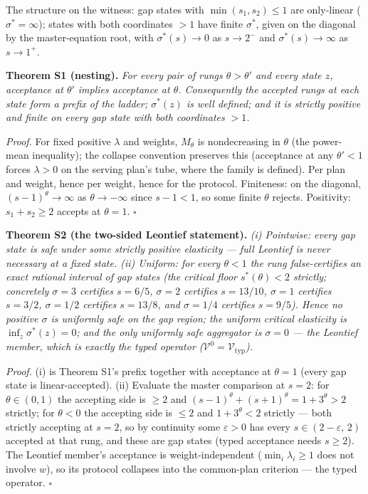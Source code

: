 \documentclass[3p,11pt]{elsarticle}
\begin{document}
The structure on the witness: gap states with \(\min(s_1, s_2) \le 1\)
are only-linear (\(\sigma^* = \infty\)); states with both coordinates
\(> 1\) have finite \(\sigma^*\), given on the diagonal by the
master-equation root, with \(\sigma^*(s) \to 0\) as \(s \to 2^-\)
and \(\sigma^*(s) \to \infty\) as \(s \to 1^+\).

\textbf{Theorem S1 (nesting).} \emph{For every pair of rungs
\(\theta > \theta'\) and every state \(z\), acceptance at
\(\theta'\) implies acceptance at \(\theta\). Consequently the
accepted rungs at each state form a prefix of the ladder;
\(\sigma^*(z)\) is well defined; and it is strictly positive and finite
on every gap state with both coordinates \(> 1\).}

\emph{Proof.} For fixed positive \(\lambda\) and weights,
\(M_\theta\) is nondecreasing in \(\theta\) (the power-mean
inequality); the collapse convention preserves this (acceptance at any
\(\theta' < 1\) forces \(\lambda > 0\) on the serving plan's tube,
where the family is defined). Per plan and weight, hence per weight, hence
for the protocol. Finiteness: on the diagonal, \((s-1)^\theta \to
\infty\) as \(\theta \to -\infty\) since \(s - 1 < 1\), so some
finite \(\theta\) rejects. Positivity: \(s_1 + s_2 \ge 2\) accepts
at \(\theta = 1\). \ensuremath{\square}

\textbf{Theorem S2 (the two-sided Leontief statement).} \emph{(i)
Pointwise: every gap state is safe under some strictly positive
elasticity --- full Leontief is never necessary at a fixed state. (ii)
Uniform: for every \(\theta < 1\) the rung false-certifies an exact
rational interval of gap states (the critical floor \(s^*(\theta) < 2\)
strictly; concretely \(\sigma = 3\) certifies \(s = 6/5\),
\(\sigma = 2\) certifies \(s = 13/10\), \(\sigma = 1\) certifies
\(s = 3/2\), \(\sigma = 1/2\) certifies \(s = 13/8\), and
\(\sigma = 1/4\) certifies \(s = 9/5\)). Hence no positive
\(\sigma\) is uniformly safe on the gap region; the uniform critical
elasticity is \(\inf_z \sigma^*(z) = 0\); and the only uniformly safe
aggregator is \(\sigma = 0\) --- the Leontief member, which is exactly
the typed operator (\(\mathcal{V}^0 = \mathcal{V}_{\mathrm{typ}}\)).}

\emph{Proof.} (i) is Theorem S1's prefix together with acceptance at
\(\theta = 1\) (every gap state is linear-accepted). (ii) Evaluate the
master comparison at \(s = 2\): for \(\theta \in (0,1)\) the
accepting side is \(\ge 2\) and \((s-1)^\theta + (s+1)^\theta = 1 +
3^\theta > 2\) strictly; for \(\theta < 0\) the accepting side is
\(\le 2\) and \(1 + 3^\theta < 2\) strictly --- both strictly
accepting at \(s = 2\), so by continuity some \(\varepsilon > 0\)
has every \(s \in (2 - \varepsilon,\, 2)\) accepted at that rung, and
these are gap states (typed acceptance needs \(s \ge 2\)). The Leontief
member's acceptance is weight-independent (\(\min_i \lambda_i \ge 1\)
does not involve \(w\)), so its protocol collapses into the common-plan
criterion --- the typed operator. \ensuremath{\square}
\end{document}
